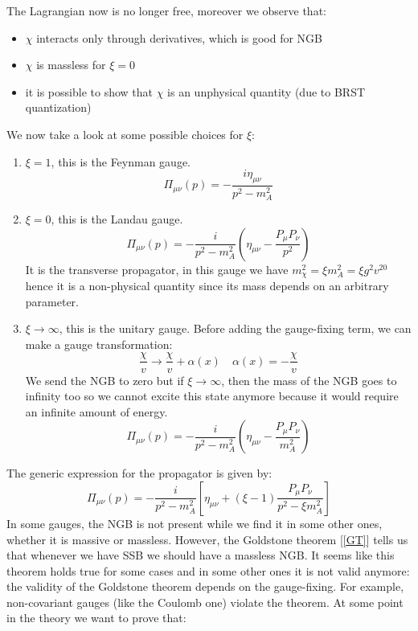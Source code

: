 \documentclass[../main.tex]{subfiles}
\begin{document}
The Lagrangian now is no longer free, moreover we observe that:
\begin{itemize}
    \item $\chi$ interacts only through derivatives, which is good for NGB 
    \item $\chi$ is massless for $\xi=0$
    \item it is possible to show that $\chi$ is an unphysical quantity (due to BRST quantization)
\end{itemize}
We now take a look at some possible choices for $\xi$:
\begin{enumerate}
    \item $\xi=1$, this is the Feynman gauge.
    \[
    \Pi_{\mu\nu}(p)=-\frac{i\eta_{\mu\nu}}{p^2-m_A^2}
    \]
    \item $\xi=0$, this is the Landau gauge.
    \[
    \Pi_{\mu\nu}(p)=-\frac{i}{p^2-m_A^2}\left(\eta_{\mu\nu}-\frac{P_\mu P_\nu}{p^2}\right)
    \]
    It is the transverse propagator, in this gauge we have $m_\chi^2=\xi m_A^2=\xi g^2v^20$ hence it is a non-physical quantity since its mass depends on an arbitrary parameter.
    \item $\xi\to\infty$, this is the unitary gauge. Before adding the gauge-fixing term, we can make a gauge transformation:
    \[
    \frac{\chi}{v}\to\frac{\chi}{v}+\alpha(x) \quad \alpha(x)=-\frac{\chi}{v} 
    \]
    We send the NGB to zero but if $\xi\to\infty$, then the mass of the NGB goes to infinity too so we cannot excite this state anymore because it would require an infinite amount of energy.
    \[
    \Pi_{\mu\nu}(p)=-\frac{i}{p^2-m_A^2}\left(\eta_{\mu\nu}-\frac{P_\mu P_\nu}{m_A^2}\right)
    \]
\end{enumerate}
The generic expression for the propagator is given by:
\[
\Pi_{\mu\nu}(p)=-\frac{i}{p^2-m_A^2}\left[\eta_{\mu\nu}+(\xi-1)\frac{P_\mu P_\nu}{p^2-\xi m_A^2}\right]
\]
In some gauges, the NGB is not present while we find it in some other ones, whether it is massive or massless. However, the Goldstone theorem [\ref{GT}] tells us that whenever we have SSB we should have a massless NGB. It seems like this theorem holds true for some cases and in some other ones it is not valid anymore: the validity of the Goldstone theorem depends on the gauge-fixing. For example, non-covariant gauges (like the Coulomb one) violate the theorem. At some point in the theory we want to prove that:
\end{document}

